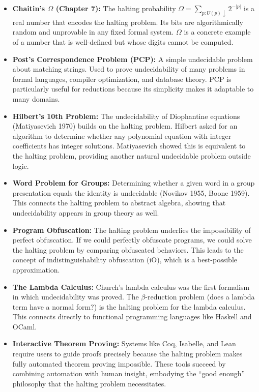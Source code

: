 \begin{itemize}
\item \textbf{Chaitin's $\Omega$ (Chapter 7):} The halting probability $\Omega = \sum_{p: U(p)\downarrow} 2^{-|p|}$ is a real number that encodes the halting problem. Its bits are algorithmically random and unprovable in any fixed formal system. $\Omega$ is a concrete example of a number that is well-defined but whose digits cannot be computed.

\item \textbf{Post's Correspondence Problem (PCP):} A simple undecidable problem about matching strings. Used to prove undecidability of many problems in formal languages, compiler optimization, and database theory. PCP is particularly useful for reductions because its simplicity makes it adaptable to many domains.

\item \textbf{Hilbert's 10th Problem:} The undecidability of Diophantine equations (Matiyasevich 1970) builds on the halting problem. Hilbert asked for an algorithm to determine whether any polynomial equation with integer coefficients has integer solutions. Matiyasevich showed this is equivalent to the halting problem, providing another natural undecidable problem outside logic.

\item \textbf{Word Problem for Groups:} Determining whether a given word in a group presentation equals the identity is undecidable (Novikov 1955, Boone 1959). This connects the halting problem to abstract algebra, showing that undecidability appears in group theory as well.

\item \textbf{Program Obfuscation:} The halting problem underlies the impossibility of perfect obfuscation. If we could perfectly obfuscate programs, we could solve the halting problem by comparing obfuscated behaviors. This leads to the concept of indistinguishability obfuscation (iO), which is a best-possible approximation.

\item \textbf{The Lambda Calculus:} Church's lambda calculus was the first formalism in which undecidability was proved. The $\beta$-reduction problem (does a lambda term have a normal form?) is the halting problem for the lambda calculus. This connects directly to functional programming languages like Haskell and OCaml.

\item \textbf{Interactive Theorem Proving:} Systems like Coq, Isabelle, and Lean require users to guide proofs precisely because the halting problem makes fully automated theorem proving impossible. These tools succeed by combining automation with human insight, embodying the ``good enough'' philosophy that the halting problem necessitates.


\end{itemize}
